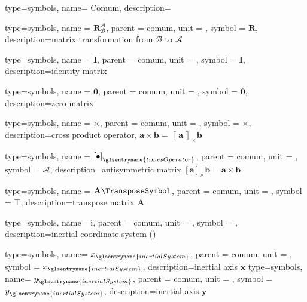 {type=symbols,
  name= {Comum},
  description={}
}

{type=symbols,
  name = {\ensuremath{{\mathbf{R}}_{\mathcal{B}}^{\mathcal{A}}}},
  parent = {comum},
  unit = \unexpanded{},
  symbol = \ensuremath{\mathbf{R}},
  description={matrix transformation from $\mathcal{B}$ to $\mathcal{A}$}
}

{type=symbols,
  name = {\ensuremath{\mathbf{I}}},
  parent = {comum},
  unit = \unexpanded{},
  symbol = \ensuremath{\mathbf{I}},
  description={identity matrix}
}

{type=symbols,
  name = {\ensuremath{\mathbf{0}}},
  parent = {comum},
  unit = \unexpanded{},
  symbol = \ensuremath{\mathbf{0}},
  description={zero matrix}
}

{type=symbols,
  name = \ensuremath{\times},
  parent = {comum},
  unit = \unexpanded{},
  symbol = \ensuremath{\times},
  description={cross product operator, $\boldsymbol{a}\times\boldsymbol{b}=\left\llbracket \boldsymbol{a}\right\rrbracket_{\times} \boldsymbol{b}$}
}

{type=symbols,
  name = \ensuremath{{\left[\bullet\right]}_\glsentryname{timesOperator}},
  parent = {comum},
  unit = \unexpanded{},
  symbol = \ensuremath{\mathcal{A}},
  description={antisymmetric matrix $\left[\boldsymbol{a}\right]_{\times}\boldsymbol{b}=\boldsymbol{a}\times\boldsymbol{b}$}
}

{type=symbols,
  name = \ensuremath{\mathbf{A}\TransposeSymbol},
  parent = {comum},
  unit = \unexpanded{},
  symbol = \ensuremath{\intercal},
  description={transpose matrix $\mathbf{A}$}
}


{type=symbols,
  name= \ensuremath{\mathrm{i}},
  parent = {comum},
  unit = \unexpanded{},
  symbol = ,
  description={inertial coordinate system ()}
}

{type=symbols,
  name= \ensuremath{x_{\glsentryname{inertialSystem}}},
  parent = {comum},
  unit = \unexpanded{},
  symbol = \ensuremath{x_{\glsentryname{inertialSystem}}},
  description={inertial axis $\mathbf{x}$}
}
{type=symbols,
  name= \ensuremath{y_{\glsentryname{inertialSystem}}},
  parent = {comum},
  unit = \unexpanded{},
  symbol = \ensuremath{y_{\glsentryname{inertialSystem}}},
  description={inertial axis $\mathbf{y}$}
}

